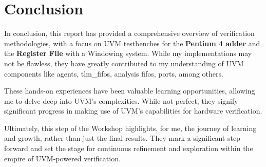 \documentclass[12pt,a4paper]{report}
\begin{document}
\chapter{Conclusion}

In conclusion, this report has provided a comprehensive overview of verification methodologies, with a focus on UVM testbenches for the \textbf{Pentium 4 adder} and the \textbf{Register File} with a Windowing system. While my implementations may not be flawless, they have greatly contributed to my understanding of UVM components like agents, tlm\_fifos, analysis fifos, ports, among others.

These hands-on experiences have been valuable learning opportunities, allowing me to delve deep into UVM's complexities. While not perfect, they signify significant progress in making use of UVM's capabilities for hardware verification.

Ultimately, this step of the Workshop highlights, for me, the journey of learning and growth, rather than just the final results. They mark a significant step forward and set the stage for continuous refinement and exploration within the empire of UVM-powered verification.
\end{document}
